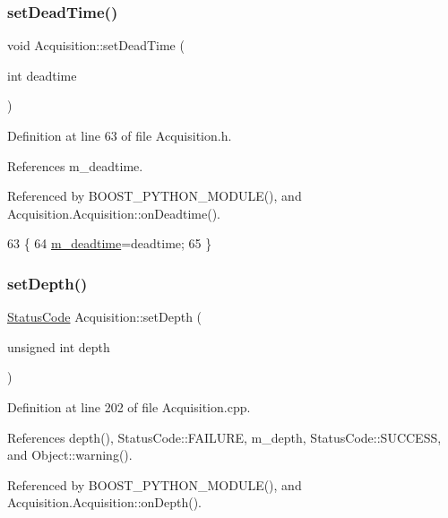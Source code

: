 \subsubsection{\texorpdfstring{set\+Dead\+Time()}{setDeadTime()}}
{\footnotesize\ttfamily void Acquisition\+::set\+Dead\+Time (\begin{DoxyParamCaption}\item[{int}]{deadtime }\end{DoxyParamCaption})\hspace{0.3cm}{\ttfamily [inline]}}



Definition at line 63 of file Acquisition.\+h.



References m\+\_\+deadtime.



Referenced by B\+O\+O\+S\+T\+\_\+\+P\+Y\+T\+H\+O\+N\+\_\+\+M\+O\+D\+U\+L\+E(), and Acquisition.\+Acquisition\+::on\+Deadtime().


\begin{DoxyCode}
63                                 \{
64     \hyperlink{classAcquisition_a5f7fe20506e7d860ed61935255adfe17}{m\_deadtime}=deadtime;
65   \}
\end{DoxyCode}
\mbox{\label{classAcquisition_a303145d497f99da966fcfd95c00cd81e}} 
\subsubsection{\texorpdfstring{set\+Depth()}{setDepth()}}
{\footnotesize\ttfamily \hyperlink{classStatusCode}{Status\+Code} Acquisition\+::set\+Depth (\begin{DoxyParamCaption}\item[{unsigned int}]{depth }\end{DoxyParamCaption})}



Definition at line 202 of file Acquisition.\+cpp.



References depth(), Status\+Code\+::\+F\+A\+I\+L\+U\+RE, m\+\_\+depth, Status\+Code\+::\+S\+U\+C\+C\+E\+SS, and Object\+::warning().



Referenced by B\+O\+O\+S\+T\+\_\+\+P\+Y\+T\+H\+O\+N\+\_\+\+M\+O\+D\+U\+L\+E(), and Acquisition.\+Acquisition\+::on\+Depth().


